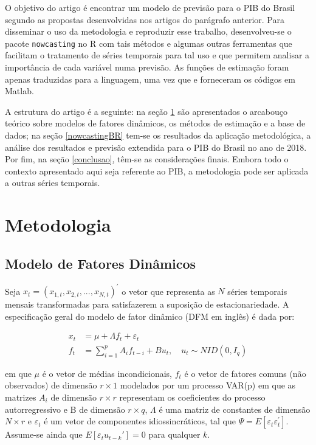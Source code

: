 \documentclass{article}
\begin{document}
O objetivo do artigo é encontrar um modelo de previsão para o PIB do Brasil segundo as propostas desenvolvidas nos artigos do parágrafo anterior. Para disseminar o uso da metodologia e reproduzir esse trabalho, desenvolveu-se o pacote \texttt{nowcasting} no \textsf{R} com tais métodos e algumas outras ferramentas que facilitam o tratamento de séries temporais para tal uso e que permitem analisar a importância de cada variável numa previsão. As funções de estimação foram apenas traduzidas para a linguagem, uma vez que \cite{giannoneetal2008} e \cite{banburaetal2011} forneceram os códigos em \textsf{Matlab}.

A estrutura do artigo é a seguinte: na seção \ref{metodo} são apresentados o arcabouço teórico sobre modelos de fatores dinâmicos, os métodos de estimação e a base de dados; na seção \ref{nowcastingBR} tem-se os resultados da aplicação metodológica, a análise dos resultados e previsão extendida para o PIB do Brasil no ano de 2018. Por fim, na seção \ref{conclusao}, têm-se as considerações finais. Embora todo o contexto apresentado aqui seja referente ao PIB, a metodologia pode ser aplicada a outras séries temporais. 

\section{Metodologia}\label{metodo}

\subsection{Modelo de Fatores Dinâmicos}\label{DFMmodel}

Seja $x_t = (x_{1,t},x_{2,t}, ..., x_{N,t})^{'}$ o vetor que representa as $N$ séries temporais mensais transformadas para satisfazerem a suposição de estacionariedade. A especificação geral do modelo de fator dinâmico (DFM em inglês) é dada por:

\begin{align}
x_t   &= \mu + \Lambda f_t + \varepsilon_t \label{eq_xt} \\
f_{t} &= \sum_{i=1}^{p} A_i f_{t-i} + B u_t, \quad u_t \sim NID(0,I_q) \label{eq_ft}
\end{align}

em que $\mu$ é o vetor de médias incondicionais, $f_t$ é o vetor de fatores comuns (não observados) de dimensão $r \times 1$ modelados por um processo VAR(p) em que as matrizes $A_i$ de dimensão $r \times r$ representam os coeficientes do processo autorregressivo e B de dimensão $r \times q$, $\Lambda$ é uma matriz de constantes de dimensão $N \times r$ e $\varepsilon_t$ é um vetor de componentes idiossincráticos, tal que $\Psi = E[\varepsilon_{t} \varepsilon^{'}_{t}]$. Assume-se ainda que $E[\varepsilon_t u_{t-k}'] = 0$ para qualquer $k$. %
\end{document}
